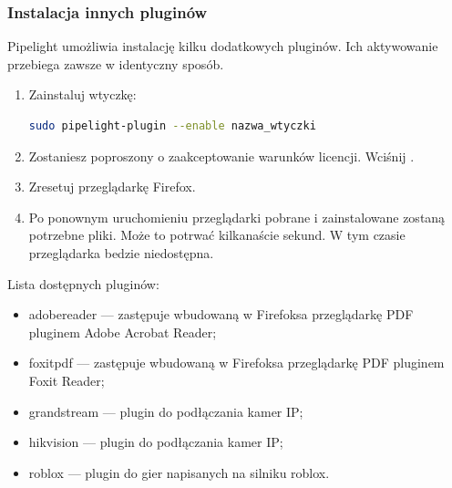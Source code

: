 \subsubsection{Instalacja innych pluginów}
\noindent Pipelight umożliwia instalację kilku dodatkowych pluginów. Ich aktywowanie przebiega zawsze w identyczny sposób.
\begin{enumerate}
\item Zainstaluj wtyczkę:
\begin{lstlisting}[language=bash]
sudo pipelight-plugin --enable nazwa_wtyczki
\end{lstlisting}
\item Zostaniesz poproszony o zaakceptowanie warunków licencji. Wciśnij .
\item Zresetuj przeglądarkę Firefox.
\item Po ponownym uruchomieniu przeglądarki pobrane i zainstalowane zostaną potrzebne pliki. Może to potrwać kilkanaście sekund. W tym czasie przeglądarka bedzie niedostępna.
\end{enumerate}
Lista dostępnych pluginów:
\begin{itemize}
\item \textcolor{ubuntu_orange}{adobereader} --- zastępuje wbudowaną w Firefoksa przeglądarkę PDF pluginem Adobe Acrobat Reader;
\item \textcolor{ubuntu_orange}{foxitpdf} --- zastępuje wbudowaną w Firefoksa przeglądarkę PDF pluginem Foxit Reader;
\item \textcolor{ubuntu_orange}{grandstream} --- plugin do podłączania kamer IP;
\item \textcolor{ubuntu_orange}{hikvision} --- plugin do podłączania kamer IP;
\item \textcolor{ubuntu_orange}{roblox} --- plugin do gier napisanych na silniku roblox.
\end{itemize}

